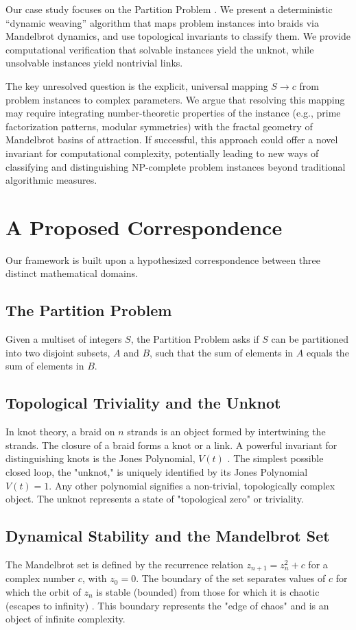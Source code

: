\documentclass[11pt, a4paper]{article}
\begin{document}
Our case study focuses on the Partition Problem \cite{Karp1972}. We present a deterministic “dynamic weaving” algorithm that maps problem instances into braids via Mandelbrot dynamics, and use topological invariants to classify them. We provide computational verification that solvable instances yield the unknot, while unsolvable instances yield nontrivial links.

The key unresolved question is the explicit, universal mapping $S \to c$ from problem instances to complex parameters. We argue that resolving this mapping may require integrating number-theoretic properties of the instance (e.g., prime factorization patterns, modular symmetries) with the fractal geometry of Mandelbrot basins of attraction. If successful, this approach could offer a novel invariant for computational complexity, potentially leading to new ways of classifying and distinguishing NP-complete problem instances beyond traditional algorithmic measures.

\section{A Proposed Correspondence}

Our framework is built upon a hypothesized correspondence between three distinct mathematical domains.

\subsection{The Partition Problem}
Given a multiset of integers $S$, the Partition Problem asks if $S$ can be partitioned into two disjoint subsets, $A$ and $B$, such that the sum of elements in $A$ equals the sum of elements in $B$.

\subsection{Topological Triviality and the Unknot}
In knot theory, a braid on $n$ strands is an object formed by intertwining the strands. The closure of a braid forms a knot or a link. A powerful invariant for distinguishing knots is the Jones Polynomial, $V(t)$ \cite{Jones1985}. The simplest possible closed loop, the "unknot," is uniquely identified by its Jones Polynomial $V(t) = 1$. Any other polynomial signifies a non-trivial, topologically complex object. The unknot represents a state of "topological zero" or triviality.

\subsection{Dynamical Stability and the Mandelbrot Set}
The Mandelbrot set is defined by the recurrence relation $z_{n+1} = z_n^2 + c$ for a complex number $c$, with $z_0 = 0$. The boundary of the set separates values of $c$ for which the orbit of $z_n$ is stable (bounded) from those for which it is chaotic (escapes to infinity) \cite{Mandelbrot1982}. This boundary represents the "edge of chaos" and is an object of infinite complexity.
\end{document}
